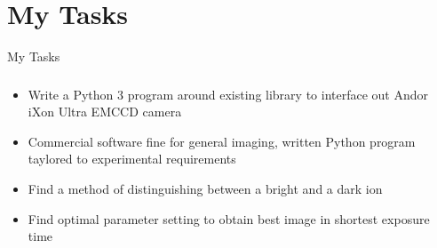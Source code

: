 \documentclass{beamer}
\begin{document}

\section{My Tasks}

\begin{frame}{My Tasks}
\frametitle{}
\begin{itemize}
\item Write a Python 3 program around existing library to interface out Andor iXon Ultra EMCCD camera
\bigskip
\item Commercial software fine for general imaging, written Python program taylored to experimental requirements
\bigskip
\item Find a method of distinguishing between a bright and a dark ion
\bigskip
\item Find optimal parameter setting to obtain best image in shortest exposure time
\end{itemize}


\end{frame}

\end{document}

